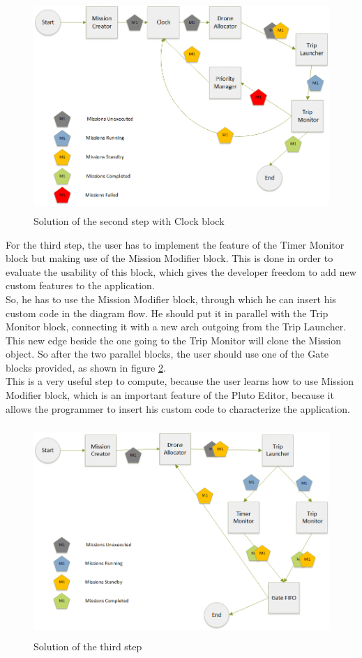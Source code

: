 \begin{figure}[htb]
  \centering
  \includegraphics[width=\linewidth,height=8cm]{pictures/secondStepClock.png}
  \caption{Solution of the second step with Clock block}
  \label{fig:secondStepClock}
\end{figure}

For the third step, the user has to implement the feature of the Timer Monitor block but making use of the Mission Modifier block. This is done in order to evaluate the usability of this block, which gives the developer freedom to add new custom features to the application.
\\
So, he has to use the Mission Modifier block, through which he can insert his custom code in the diagram flow. He should put it in parallel with the Trip Monitor block, connecting it with a new arch outgoing from the Trip Launcher. This new edge beside the one going to the Trip Monitor will clone the Mission object. So after the two parallel blocks, the user should use one of the Gate blocks provided, as shown in figure \ref{fig:thirdStep}.
\\

This is a very useful step to compute, because the user learns how to use Mission Modifier block, which is an important feature of the Pluto Editor, because it allows the programmer to insert his custom code to characterize the application.
\\

\newpage

\begin{figure}[htb]
  \centering
  \includegraphics[width=\linewidth, height=8cm]{pictures/thirdStep.png}
  \caption{Solution of the third step}
  \label{fig:thirdStep}
\end{figure}

